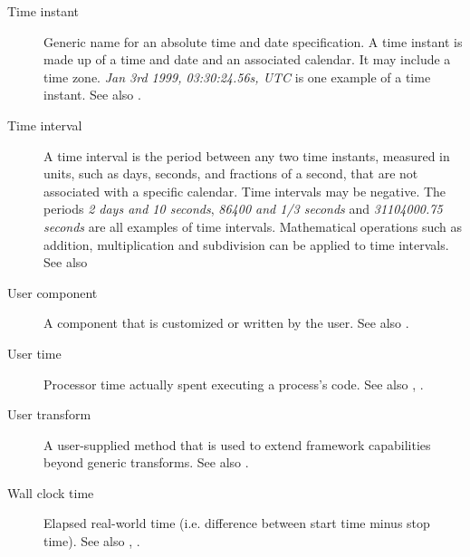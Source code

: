 \begin{description}
\item [Time instant] \label{glos:TimeInstant}
  Generic name for an absolute time and date specification. A time instant is made 
  up of a time and date and an associated calendar. It may include a time zone.
  \emph{Jan 3rd 1999, 03:30:24.56s, UTC} is one example of a time instant.
  See also .

\item [Time interval] \label{glos:TimeInterval} A time interval is the
  period between any two time instants, measured in units, such as days, 
  seconds, and fractions of a second, that are not associated with a specific
  calendar.  Time intervals may be negative.  The periods \emph{2 days and 10 seconds}, 
  \emph{86400 and 1/3 seconds} and \emph{31104000.75 seconds} are all examples of time intervals.  
  Mathematical operations such as addition, multiplication and subdivision 
  can be applied to time intervals. See also 

\item [User component] \label{UserComp} A component that is customized or
  written by the user.  See also .

\item [User time] \label{UserTime} Processor time actually spent executing 
  a process's code. See also , 
  .

\item[User transform] \label{glos:UserTrans} A user-supplied 
  method that is used to extend framework capabilities beyond generic 
  transforms. See also . 

\item [Wall clock time] \label{WallClockTime} Elapsed real-world time 
  (i.e. difference between start time minus stop time).
  See also , .

\end{description}








































